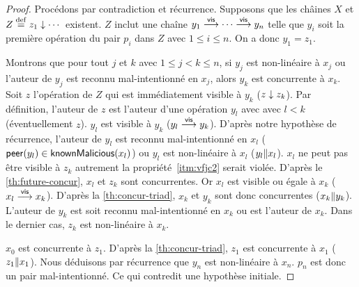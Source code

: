 \begin{proof}
Procédons par contradiction et récurrence.
Supposons que les châines $X$ et $Z \overset{\mathrm{def}}{=} z_1 \downarrow \dotsb$ existent.
$Z$ inclut une chaîne $y_1 \overset{\mathsf{vis}}{\longrightarrow} \dotsb \overset{\mathsf{vis}}{\longrightarrow} y_n$ telle que $y_i$ soit la première opération du pair $p_i$ dans $Z$ avec $1 \leq i \leq n$.
On a donc $y_1 = z_1$.

Montrons que pour tout $j$ et $k$ avec $1 \leq j < k \leq n$, si $y_j$ est non-linéaire à $x_j$ ou l'auteur de $y_j$ est reconnu mal-intentionné en $x_j$, alors $y_k$ est concurrente à $x_k$.
Soit $z$ l'opération de $Z$ qui est immédiatement visible à $y_k$ ($z \downarrow z_k$).
Par définition, l'auteur de $z$ est l'auteur d'une opération $y_l$ avec avec $l < k$ (éventuellement $z$).
$y_l$ est visible à $y_k$ ($y_l \overset{\mathsf{vis}}{\longrightarrow} y_k$).
D'après notre hypothèse de récurrence, l'auteur de $y_l$ est reconnu mal-intentionné en $x_l$ ($\operatorname{\mathsf{peer}}(y_l) \in \operatorname{\mathsf{knownMalicious}}(x_l)$) ou $y_l$ est non-linéaire à $x_l$ ($y_l \| x_l$).
$x_l$ ne peut pas être visible à $z_k$ autrement la propriété~\ref{itm:vfjc2} serait violée.
D'après le \autoref{th:future-concur}, $x_l$ et $z_k$ sont concurrentes.
Or $x_l$ est visible ou égale à $x_k$ ($x_l \overset{\mathsf{vis}}{\longrightarrow} x_k$).
D'après la \autoref{th:concur-triad}, $x_k$ et $y_k$ sont donc concurrentes ($x_k \| y_k$).
L'auteur de $y_k$ est soit reconnu mal-intentionné en $x_k$ ou est l'auteur de $x_k$.
Dans le dernier cas, $z_k$ est non-linéaire à $x_k$.

$x_0$ est concurrente à $z_1$.
D'après la \autoref{th:concur-triad}, $z_1$ est concurrente à $x_1$ ($z_1 \| x_1$).
Nous déduisons par récurrence que $y_n$ est non-linéaire à $x_n$.
$p_n$ est donc un pair mal-intentionné.
Ce qui contredit une hypothèse initiale.
\end{proof}

